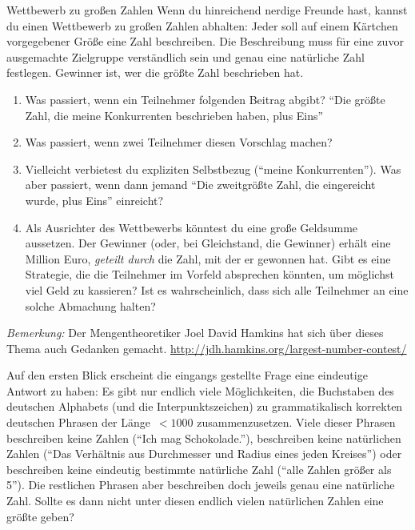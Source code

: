 \documentclass[twoside]{../zirkelblatt1415}
\theoremstyle{definition}
\theoremstyle{plain}
\theoremstyle{remark}
\begin{document}
\begin{aufgabe}{Wettbewerb zu großen Zahlen}
Wenn du hinreichend nerdige Freunde hast, kannst du einen Wettbewerb zu großen
Zahlen abhalten: Jeder soll auf einem Kärtchen vorgegebener Größe eine Zahl
beschreiben. Die Beschreibung muss für eine zuvor ausgemachte Zielgruppe
verständlich sein und genau eine natürliche Zahl festlegen. Gewinner ist, wer
die größte Zahl beschrieben hat.

\begin{enumerate}
\item Was passiert, wenn ein Teilnehmer folgenden Beitrag abgibt? "`Die größte
Zahl, die meine Konkurrenten beschrieben haben, plus Eins"'
\item Was passiert, wenn zwei Teilnehmer diesen Vorschlag machen?
\item Vielleicht verbietest du expliziten Selbstbezug ("`meine Konkurrenten"').
Was aber passiert, wenn dann jemand "`Die zweitgrößte Zahl, die eingereicht
wurde, plus Eins"' einreicht?
\item Als Ausrichter des Wettbewerbs könntest du eine große Geldsumme
aussetzen. Der Gewinner (oder, bei Gleichstand, die Gewinner) erhält eine
Million Euro, \emph{geteilt durch} die Zahl, mit der er gewonnen hat. Gibt es
eine Strategie, die die Teilnehmer im Vorfeld absprechen könnten, um möglichst
viel Geld zu kassieren? Ist es wahrscheinlich, dass sich alle Teilnehmer an
eine solche Abmachung halten?
\end{enumerate}

\emph{Bemerkung:} Der Mengentheoretiker Joel David Hamkins hat sich über dieses
Thema auch Gedanken gemacht.
\url{http://jdh.hamkins.org/largest-number-contest/}
\end{aufgabe}

Auf den ersten Blick erscheint die eingangs gestellte Frage eine
eindeutige Antwort zu haben: Es gibt nur endlich viele Möglichkeiten, die
Buchstaben des deutschen Alphabets (und die Interpunktszeichen) zu
grammatikalisch korrekten deutschen Phrasen der Länge~$< 1000$
zusammenzusetzen. Viele dieser Phrasen beschreiben keine Zahlen ("`Ich mag
Schokolade."'), beschreiben keine natürlichen Zahlen ("`Das Verhältnis aus
Durchmesser und Radius eines jeden Kreises"') oder beschreiben keine eindeutig
bestimmte natürliche Zahl ("`alle Zahlen größer als 5"'). Die restlichen
Phrasen aber beschreiben doch jeweils genau eine natürliche Zahl. Sollte es
dann nicht unter diesen endlich vielen natürlichen Zahlen eine größte geben?
\end{document}
